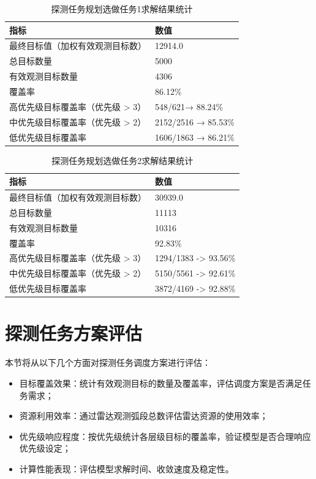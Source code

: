\documentclass[openany,zihao=-4,UTF8]{ctexart}
\begin{document}
\begin{table}[h]
    \centering
    \caption{探测任务规划选做任务1求解结果统计}
    \label{tab:探测任务规划选做任务1求解结果统计}
    \begin{tabularx}{0.8\columnwidth}{Xl}
        \toprule
        \textbf{指标}        & \textbf{数值}      \\
        \midrule
        最终目标值（加权有效观测目标数）   & 12914.0           \\
        总目标数量              & 5000              \\
        有效观测目标数量           & 4306              \\
        覆盖率                & 86.12\%          \\
        高优先级目标覆盖率（优先级 > 3） & 548/621→ 88.24\%  \\
        中优先级目标覆盖率（优先级 > 2） & 2152/2516 → 85.53\%  \\
        低优先级目标覆盖率          & 1606/1863 → 86.21\% \\
        \bottomrule
    \end{tabularx}
\end{table}

\begin{table}[h]
    \centering
    \caption{探测任务规划选做任务2求解结果统计}
    \label{tab:探测任务规划选做任务2求解结果统计}
    \begin{tabularx}{0.8\columnwidth}{Xl}
        \toprule
        \textbf{指标}        & \textbf{数值}      \\
        \midrule
        最终目标值（加权有效观测目标数）   & 30939.0           \\
        总目标数量              & 11113              \\
        有效观测目标数量           & 10316              \\
        覆盖率                & 92.83\%          \\
        高优先级目标覆盖率（优先级 > 3） & 1294/1383 -> 93.56\%  \\
        中优先级目标覆盖率（优先级 > 2） & 5150/5561 -> 92.61\%  \\
        低优先级目标覆盖率          & 3872/4169 -> 92.88\% \\
        \bottomrule
    \end{tabularx}
\end{table}

\newpage
\section{探测任务方案评估}
本节将从以下几个方面对探测任务调度方案进行评估：
\begin{itemize}
    \item {目标覆盖效果}：统计有效观测目标的数量及覆盖率，评估调度方案是否满足任务需求；
    \item {资源利用效率}：通过雷达观测弧段总数评估雷达资源的使用效率；
    \item {优先级响应程度}：按优先级统计各层级目标的覆盖率，验证模型是否合理响应优先级设定；
    \item {计算性能表现}：评估模型求解时间、收敛速度及稳定性。
\end{itemize}
\end{document}
